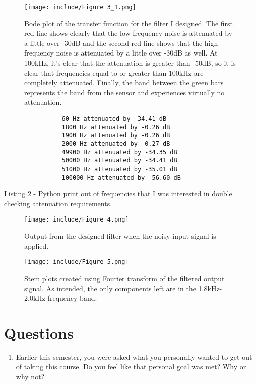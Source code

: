 \documentclass[12pt]{article}
\begin{document}
\begin{figure}[H]
\centering
\texttt{[image: include/Figure 3\_1.png]}
\caption{Bode plot of the transfer function for the filter I designed. The first red line shows clearly that the low frequency noise is attenuated by a little over -30dB and the second red line shows that the high frequency noise is attenuated by a little over -30dB as well. At 100kHz, it's clear that the attenuation is greater than -50dB, so it is clear that frequencies equal to or greater than 100kHz are completely attenuated. Finally, the band between the green bars represents the band from the sensor and experiences virtually no attenuation.}
\end{figure}

\begin{verbatim}
                60 Hz attenuated by -34.41 dB
                1800 Hz attenuated by -0.26 dB
                1900 Hz attenuated by -0.26 dB
                2000 Hz attenuated by -0.27 dB
                49900 Hz attenuated by -34.35 dB
                50000 Hz attenuated by -34.41 dB
                51000 Hz attenuated by -35.01 dB
                100000 Hz attenuated by -56.60 dB
\end{verbatim}
\begin{center}
Listing 2 - Python print out of frequencies that I was interested in double checking attenuation requirements.
\end{center}

\begin{figure}[H]
\centering
\texttt{[image: include/Figure 4.png]}
\caption{Output from the designed filter when the noisy input signal is applied.}
\end{figure}

\begin{figure}[H]
\centering
\texttt{[image: include/Figure 5.png]}
\caption{Stem plots created using Fourier transform of the filtered output signal. As intended, the only components left are in the 1.8kHz-2.0kHz frequency band.}
\end{figure}


\newpage
\section*{Questions}

\begin{enumerate}
    \item Earlier this semester, you were asked what you personally wanted to get out of taking this course. Do you feel like that personal goal was met?  Why or why not?
\end{enumerate}
    \par 
    
\end{document}
